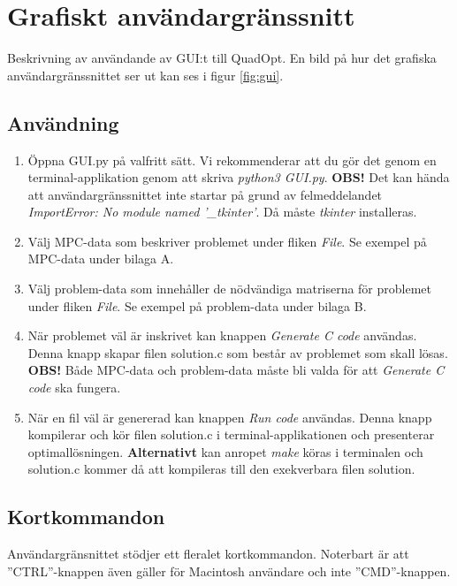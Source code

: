 \section{Grafiskt användargränssnitt}
Beskrivning av användande av GUI:t till QuadOpt. En bild på hur det grafiska användargränssnittet ser ut kan ses i figur \ref{fig:gui}.


\subsection{Användning}
\begin{enumerate}
\item Öppna GUI.py på valfritt sätt. Vi rekommenderar att du gör det genom en terminal-applikation genom att skriva \emph{python3 GUI.py}.
\newline
\newline
\textbf{OBS!} Det kan hända att användargränssnittet inte startar på grund av felmeddelandet \emph{ImportError: No module named '\_tkinter'}. Då måste \emph{tkinter} installeras.
\item Välj MPC-data som beskriver problemet under fliken \emph{File}. Se exempel på MPC-data under bilaga A.
\item Välj problem-data som innehåller de nödvändiga matriserna för problemet under fliken \emph{File}. Se exempel på problem-data under bilaga B.
\item När problemet väl är inskrivet kan knappen \emph{Generate C code} användas. Denna knapp skapar filen solution.c som består av problemet som skall lösas.
\newline
\newline
\textbf{OBS!} Både MPC-data och problem-data måste bli valda för att \emph{Generate C code} ska fungera.
\item När en fil väl är genererad kan knappen \emph{Run code} användas. Denna knapp kompilerar och kör filen solution.c i terminal-applikationen och presenterar optimallösningen. 
\newline
\newline
\textbf{Alternativt} kan anropet \emph{make} köras i terminalen och solution.c kommer då att kompileras till den exekverbara filen solution.
\end{enumerate}

\subsection{Kortkommandon}
Användargränsnittet stödjer ett fleralet kortkommandon. Noterbart är att ''CTRL''-knappen även gäller för Macintosh användare och inte ''CMD''-knappen. 

